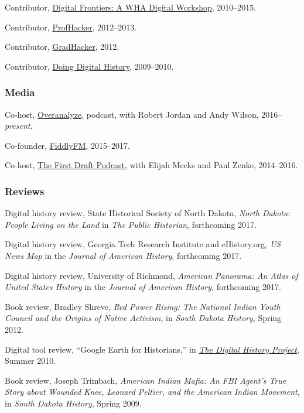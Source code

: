Contributor, \href{http://whadigitalfrontiers.com/}{Digital Frontiers: A
WHA Digital Workshop}, 2010--2015.

Contributor, \href{http://chronicle.com/blogs/profhacker/}{ProfHacker},
2012--2013.

Contributor,
\href{https://www.insidehighered.com/blogs/gradhacker}{GradHacker},
2012.

Contributor, \href{http://digitalhistory.unl.edu/}{Doing Digital
History}, 2009--2010.

\subsubsection{Media}\label{media}

Co-host, \href{http://overanalyze.fireside.fm}{Overanalyze}, podcast,
with Robert Jordan and Andy Wilson, 2016--\emph{present}.

Co-founder, \href{http://fiddly.fm}{FiddlyFM}, 2015--2017.

Co-host, \href{http://www.fiddly.fm/firstdraft/}{The First Draft
Podcast}, with Elijah Meeks and Paul Zenke, 2014--2016.

\subsubsection{Reviews}\label{reviews}

Digital history review, State Historical Society of North Dakota,
\emph{North Dakota: People Living on the Land} in \emph{The Public
Historian}, forthcoming 2017.

Digital history review, Georgia Tech Research Institute and
eHistory.org, \emph{US News Map} in the \emph{Journal of American
History}, forthcoming 2017.

Digital history review, University of Richmond, \emph{American Panorama:
An Atlas of United States History} in the \emph{Journal of American
History}, forthcoming 2017.

Book review, Bradley Shreve, \emph{Red Power Rising: The National Indian
Youth Council and the Origins of Native Activism}, in \emph{South Dakota
History}, Spring 2012.

Digital tool review, ``Google Earth for Historians,'' in
\emph{\href{http://digitalhistory.unl.edu/t-reviews/geheppler.php}{The
Digital History Project}}, Summer 2010.

Book review, Joseph Trimbach, \emph{American Indian Mafia: An FBI
Agent's True Story about Wounded Knee, Leonard Peltier, and the American
Indian Movement}, in \emph{South Dakota History}, Spring 2009.

